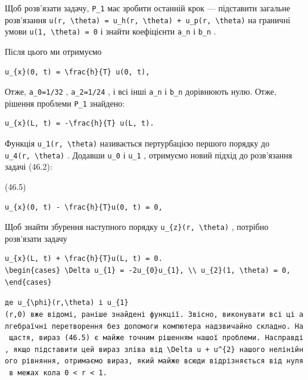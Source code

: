 \documentclass[
  ukrainian,
]{article}
\begin{document}
Щоб розв'язати задачу, \texttt{P\_1} має зробити останній крок ---
підставити загальне розв'язання
\texttt{u(r,\ \textbackslash{}theta)\ =\ u\_h(r,\ \textbackslash{}theta)\ +\ u\_p(r,\ \textbackslash{}theta)}
на граничні умови \texttt{u(1,\ \textbackslash{}theta)\ =\ 0} і знайти
коефіцієнти \texttt{a\_n} і \texttt{b\_n} .

Після цього ми отримуємо

\begin{verbatim}
u_{x}(0, t) = \frac{h}{T} u(0, t),
\end{verbatim}

Отже, \texttt{a\_0=1/32} , \texttt{a\_2=1/24} , і всі інші \texttt{a\_n}
і \texttt{b\_n} дорівнюють нулю. Отже, рішення проблеми \texttt{P\_1}
знайдено:

\begin{verbatim}
u_{x}(L, t) = -\frac{h}{T} u(L, t).
\end{verbatim}

Функція \texttt{u\_1(r,\ \textbackslash{}theta)} називається
пертурбацією першого порядку до \texttt{u\_4(r,\ \textbackslash{}theta)}
. Додавши \texttt{u\_0} і \texttt{u\_1} , отримуємо новий підхід до
розв'язання задачі (46.2):

(46.5)

\begin{verbatim}
u_{x}(0, t) - \frac{h}{T}u(0, t) = 0,
\end{verbatim}

Щоб знайти збурення наступного порядку
\texttt{u\_\{z\}(r,\ \textbackslash{}theta)} , потрібно розв'язати
задачу

\begin{verbatim}
u_{x}(L, t) + \frac{h}{T}u(L, t) = 0.
\begin{cases} \Delta u_{1} = -2u_{0}u_{1}, \\ u_{2}(1, \theta) = 0, \end{cases}
\end{verbatim}

\texttt{де\ \textquotesingle{}u\_\{\textbackslash{}phi\}(r,\textbackslash{}theta)\textquotesingle{}\ і\ \textquotesingle{}u\_\{1\}(r,0)\textquotesingle{}\ вже\ відомі,\ раніше\ знайдені\ функції.\ Звісно,\ виконувати\ всі\ ці\ алгебраїчні\ перетворення\ без\ допомоги\ комп\textquotesingle{}ютера\ надзвичайно\ складно.\ На\ щастя,\ вираз\ (46.5)\ є\ майже\ точним\ рішенням\ нашої\ проблеми.\ Насправді,\ якщо\ підставити\ цей\ вираз\ зліва\ від\ \textquotesingle{}\textbackslash{}Delta\ u\ +\ u\^{}\{2\}\textquotesingle{}\ нашого\ нелінійного\ рівняння,\ отримаємо\ вираз,\ який\ майже\ всюди\ відрізняється\ від\ нуля\ в\ межах\ кола\ 0\ \textless{}\ r\ \textless{}\ 1.}
\end{document}

